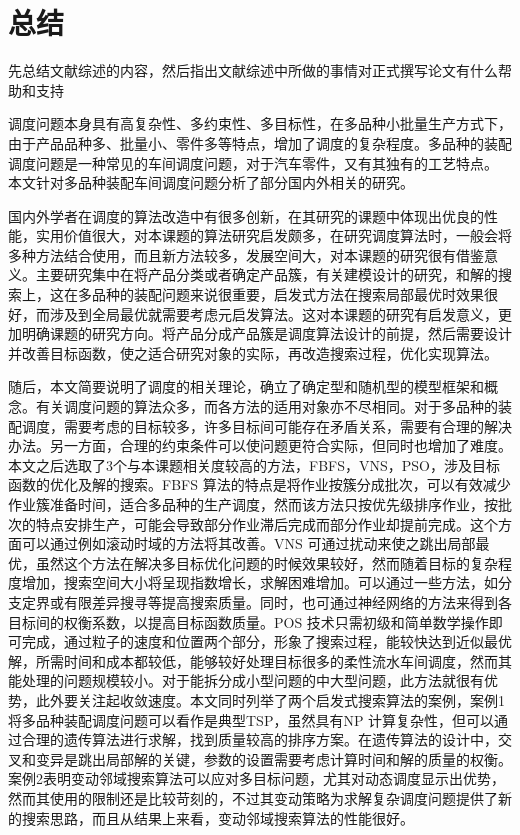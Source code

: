 \chapter{总结}
先总结文献综述的内容，然后指出文献综述中所做的事情对正式撰写论文有什么帮助和支持

调度问题本身具有高复杂性、多约束性、多目标性，在多品种小批量生产方式下，由于产品品种多、批量小、零件多等特点，增加了调度的复杂程度。多品种的装配调度问题是一种常见的车间调度问题，对于汽车零件，又有其独有的工艺特点。
本文针对多品种装配车间调度问题分析了部分国内外相关的研究。

国内外学者在调度的算法改造中有很多创新，在其研究的课题中体现出优良的性能，实用价值很大，对本课题的算法研究启发颇多，在研究调度算法时，一般会将多种方法结合使用，而且新方法较多，发展空间大，对本课题的研究很有借鉴意义。主要研究集中在将产品分类或者确定产品簇，有关建模设计的研究，和解的搜索上，这在多品种的装配问题来说很重要，启发式方法在搜索局部最优时效果很好，而涉及到全局最优就需要考虑元启发算法。这对本课题的研究有启发意义，更加明确课题的研究方向。将产品分成产品簇是调度算法设计的前提，然后需要设计并改善目标函数，使之适合研究对象的实际，再改造搜索过程，优化实现算法。

随后，本文简要说明了调度的相关理论，确立了确定型和随机型的模型框架和概念。有关调度问题的算法众多，而各方法的适用对象亦不尽相同。对于多品种的装配调度，需要考虑的目标较多，许多目标间可能存在矛盾关系，需要有合理的解决办法。另一方面，合理的约束条件可以使问题更符合实际，但同时也增加了难度。本文之后选取了3个与本课题相关度较高的方法，FBFS，VNS，PSO，涉及目标函数的优化及解的搜索。FBFS 算法的特点是将作业按簇分成批次，可以有效减少作业簇准备时间，适合多品种的生产调度，然而该方法只按优先级排序作业，按批次的特点安排生产，可能会导致部分作业滞后完成而部分作业却提前完成。这个方面可以通过例如滚动时域的方法将其改善。VNS 可通过扰动来使之跳出局部最优，虽然这个方法在解决多目标优化问题的时候效果较好，然而随着目标的复杂程度增加，搜索空间大小将呈现指数增长，求解困难增加。可以通过一些方法，如分支定界或有限差异搜寻等提高搜索质量。同时，也可通过神经网络的方法来得到各目标间的权衡系数，以提高目标函数质量。POS 技术只需初级和简单数学操作即可完成，通过粒子的速度和位置两个部分，形象了搜索过程，能较快达到近似最优解，所需时间和成本都较低，能够较好处理目标很多的柔性流水车间调度，然而其能处理的问题规模较小。对于能拆分成小型问题的中大型问题，此方法就很有优势，此外要关注起收敛速度。本文同时列举了两个启发式搜索算法的案例，案例1将多品种装配调度问题可以看作是典型TSP，虽然具有NP 计算复杂性，但可以通过合理的遗传算法进行求解，找到质量较高的排序方案。在遗传算法的设计中，交叉和变异是跳出局部解的关键，参数的设置需要考虑计算时间和解的质量的权衡。案例2表明变动邻域搜索算法可以应对多目标问题，尤其对动态调度显示出优势，然而其使用的限制还是比较苛刻的，不过其变动策略为求解复杂调度问题提供了新的搜索思路，而且从结果上来看，变动邻域搜索算法的性能很好。